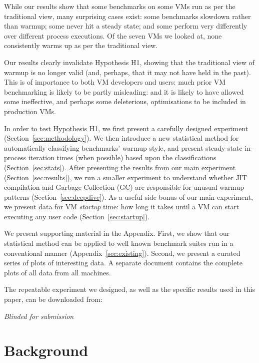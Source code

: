 \documentclass[preprint,numbers,10pt]{sigplanconf}
\begin{document}
While our results show that some benchmarks on some VMs run as per the traditional
view, many surprising cases exist: some benchmarks slowdown rather than
warmup; some never hit a steady state; and some perform very differently over
different process executions. Of the seven
VMs we looked at, none consistently warms up as per the traditional view.

Our results clearly invalidate Hypothesis H1, showing that the traditional
view of warmup is no longer valid (and, perhaps, that it may not have held in
the past). This is of importance to both VM developers and users:
much prior VM benchmarking is likely to be partly misleading: and it is
likely to have allowed some ineffective, and perhaps some deleterious,
optimisations to be included in production VMs.

\vspace{10pt}

\noindent In order to test Hypothesis H1, we first present a carefully designed
experiment (Section~\ref{sec:methodology}). We then introduce a new
statistical method for automatically classifying benchmarks' warmup style, and present steady-state
in-process iteration times (when possible) based upon the classifications
(Section~\ref{sec:stats}). After presenting the results from our
main experiment (Section~\ref{sec:results}), we run a smaller experiment to understand whether JIT
compilation and Garbage Collection (GC) are responsible for unusual warmup patterns
(Section~\ref{sec:deepdive}). As a useful side bonus of our main experiment,
we present data for VM \emph{startup} time: how long it takes until a VM can
start executing any user code (Section~\ref{sec:startup}).

We present supporting material in the Appendix. First, we show that our
statistical method can be applied to well known benchmark suites run in a
conventional manner (Appendix~\ref{sec:existing}). Second, we present a curated
series of plots of interesting data. A separate document contains the complete
plots of all data from all machines.

The repeatable experiment we designed, as well as the specific results used
in this paper, can be downloaded from:
\vspace{-.5em}
\begin{center}
\emph{Blinded for submission}
\end{center}


\section{Background}
\label{sec:warmup}
\end{document}
